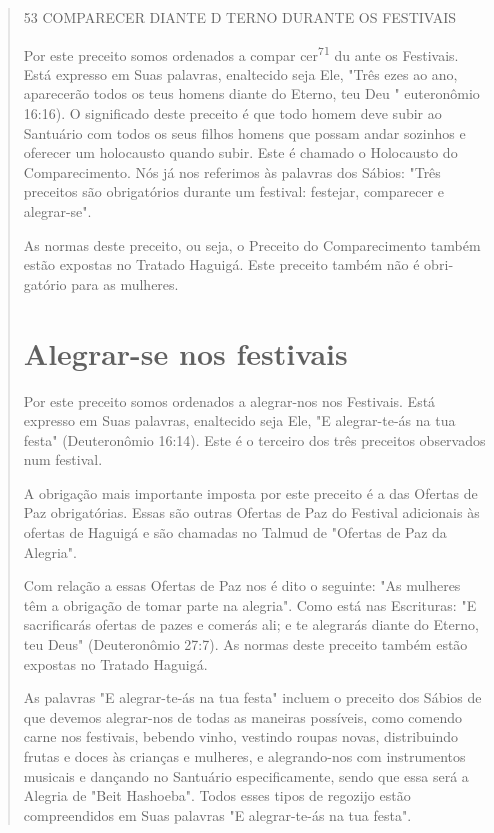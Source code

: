 \begin{quote}53 COMPARECER DIANTE D TERNO DURANTE OS FESTIVAIS

Por este preceito somos ordenados a compar cer\textsuperscript{71} du
ante os Fes­tivais. Está expresso em Suas palavras, enaltecido seja Ele,
"Três ezes ao ano, aparecerão todos os teus homens diante do Eterno, teu
Deu " euteronômio 16:16). O significado deste preceito é que todo homem
deve subir ao Santuá­rio com todos os seus filhos homens que possam
andar sozinhos e oferecer um holocausto quando subir. Este é chamado o
Holocausto do Comparecimento. Nós já nos referimos às palavras dos
Sábios: "Três preceitos são obrigatórios durante um festival: festejar,
comparecer e alegrar-se".

As normas deste preceito, ou seja, o Preceito do Comparecimento também
estão expostas no Tratado Haguigá. Este preceito também não é
obri­gatório para as mulheres.

\section{Alegrar-se nos festivais}

Por este preceito somos ordenados a alegrar-nos nos Festivais. Está
expresso em Suas palavras, enaltecido seja Ele, "E alegrar-te-ás na tua
festa" (Deuteronômio 16:14). Este é o terceiro dos três preceitos
observados num festival.

A obrigação mais importante imposta por este preceito é a das Ofer­tas
de Paz obrigatórias. Essas são outras Ofertas de Paz do Festival
adicionais às ofertas de Haguigá e são chamadas no Talmud de "Ofertas de
Paz da Alegria".

Com relação a essas Ofertas de Paz nos é dito o seguinte: "As mulhe­res
têm a obrigação de tomar parte na alegria". Como está nas Escrituras: "E
sacrificarás ofertas de pazes e comerás ali; e te alegrarás diante do
Eterno, teu Deus" (Deuteronômio 27:7). As normas deste preceito também
estão expostas no Tratado Haguigá.

As palavras "E alegrar-te-ás na tua festa" incluem o preceito dos
Sá­bios de que devemos alegrar-nos de todas as maneiras possíveis, como
comen­do carne nos festivais, bebendo vinho, vestindo roupas novas,
distribuindo frutas e doces às crianças e mulheres, e alegrando-nos com
instrumentos musicais e dançando no Santuário especificamente, sendo que
essa será a Alegria de "Beit Hashoeba". Todos esses tipos de regozijo
estão compreendidos em Suas pala­vras "E alegrar-te-ás na tua festa".


\end{quote}
